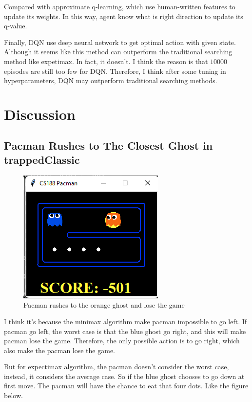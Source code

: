 \documentclass{article}[12pt]
\begin{document}
Compared with approximate q-learning, which use human-written features to update its weights. In this way, agent know what is right direction to update its q-value. 

Finally, DQN use deep neural network to get optimal action with given state. Although it seems like this method can outperform the traditional searching method like expetimax. In fact, it doesn't. I think the reason is that $10000$ episodes are still too few for DQN. Therefore, I think after some tuning in hyperparameters, DQN may outperform traditional searching methods.


\section{Discussion}
\subsection{Pacman Rushes to The Closest Ghost in trappedClassic}


\begin{figure}[H]
\centering
\includegraphics[width=0.5\linewidth]{screenshot002}
\caption{Pacman rushes to the orange ghost and lose the game}
\label{fig:screenshot002}
\end{figure}

I think it's because the minimax algorithm make pacman impossible to go left. If pacman go left, the worst case is that the blue ghost go right, and this will make pacman lose the game. Therefore, the only possible action is to go right, which also make the pacman lose the game.

But for expectimax algorithm, the pacman doesn't consider the worst case, instead, it considers the average case. So if the blue ghost chooses to go down at first move. The pacman will have the chance to eat that four dots. Like the figure below.
\end{document}
